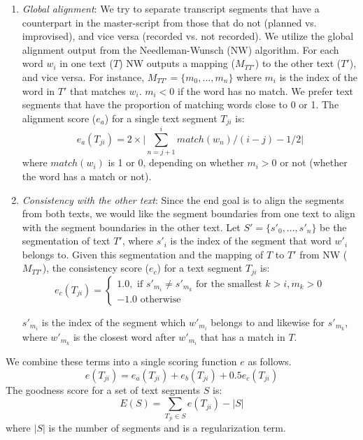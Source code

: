 \begin{enumerate}
\item{\textit{Global alignment}: We try to separate transcript segments that have a counterpart in the master-script from those that do not (planned vs. improvised), and vice versa (recorded vs. not recorded). We utilize the global alignment output from the Needleman-Wunsch (NW) algorithm. For each word $w_i$ in one text ($T$) NW outputs a mapping ($M_{TT'}$) 
to the other text ($T'$), and vice versa. For instance, $M_{TT'} = \{m_0, \dots,m_n\}$ where $m_i$ is the index of the word in  $T'$ that matches $w_i$. $m_i < 0$ if the word has no match. We prefer text segments that have the proportion of matching words close to 0 or 1. The alignment score ($e_a$) for a single text segment $T_{ji}$ is:  
\begin{equation}
e_{a}(T_{ji}) = 2\times\bigg|\sum_{n=j+1}^{i}{match(w_n)}\big/(i-j) - 1/2 \bigg|
\end{equation}
where $match(w_i)$ is 1 or 0, depending on whether $m_i > 0$ or not (whether the word has a match or not).
}
\item{\textit{Consistency with the other text}: Since the end goal is to align the segments from both texts, we would like the segment boundaries from one text to align with the segment boundaries in the other text. Let $S' = \{s'_0, \dots, s'_n\}$ be the segmentation of text $T'$, where $s'_i$ is the index of the segment that word $w'_i$ belongs to. Given this segmentation and the mapping of $T$ to $T'$ from NW  ($M_{TT'}$), the consistency score ($e_c$) for a text segment $T_{ji}$ is:
\begin{equation}
    e_c(T_{ji})= 
\begin{cases}
   1.0, \text{ if } s'_{m_i} \neq s'_{m_k} \text{ for the smallest } k>i, m_k >0\\
   -1.0 \text{ otherwise }
\end{cases}
\end{equation}

$s'_{m_i}$ is the index of the segment which $w'_{m_i}$ belongs to and likewise for $s'_{m_k}$, where $w'_{m_k}$ is the closest word after $w'_{m_i}$ that has a match in $T$.
} 
\end{enumerate}

We combine these terms into a single scoring function $e$ as follows. 
\begin{equation}
e(T_{ji}) = e_a(T_{ji}) + e_b(T_{ji}) + 0.5  e_c(T_{ji})
\end{equation}
The goodness score for a set of text segments $S$ is:
\begin{equation}
E(S) = \sum_{T_{ji}\in S}{e(T_{ji})} - \big|S\big|
\end{equation}
where $\big|S\big|$ is the number of segments and is a regularization term. 

